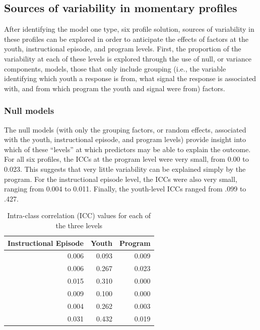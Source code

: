 \documentclass[]{book}
\theoremstyle{definition}
\theoremstyle{definition}
\theoremstyle{definition}
\theoremstyle{remark}
\begin{document}
\subsection{Sources of variability in momentary
profiles}\label{sources-of-variability-in-momentary-profiles}

After identifying the model one type, six profile solution, sources of
variability in these profiles can be explored in order to anticipate the
effects of factors at the youth, instructional episode, and program
levels. First, the proportion of the variability at each of these levels
is explored through the use of null, or variance components, models,
those that only include grouping (i.e., the variable identifying which
youth a response is from, what signal the response is associated with,
and from which program the youth and signal were from) factors.

\subsubsection{Null models}\label{null-models}

The null models (with only the grouping factors, or random effects,
associated with the youth, instructional episode, and program levels)
provide insight into which of these ``levels'' at which predictors may
be able to explain the outcome. For all six profiles, the ICCs at the
program level were very small, from 0.00 to 0.023. This suggests that
very little variability can be explained simply by the program. For the
instructional episode level, the ICCs were also very small, ranging from
0.004 to 0.011. Finally, the youth-level ICCs ranged from .099 to .427.

\begin{landscape}\begin{table}

\caption{\label{tab:unnamed-chunk-11}Intra-class correlation (ICC) values for each of the three levels}
\centering
\begin{tabular}[t]{rrr}
\toprule
Instructional Episode & Youth & Program\\
\midrule
0.006 & 0.093 & 0.009\\
0.006 & 0.267 & 0.023\\
0.015 & 0.310 & 0.000\\
0.009 & 0.100 & 0.000\\
0.004 & 0.262 & 0.003\\
0.031 & 0.432 & 0.019\\
\bottomrule
\end{tabular}
\end{table}
\end{landscape}
\end{document}
